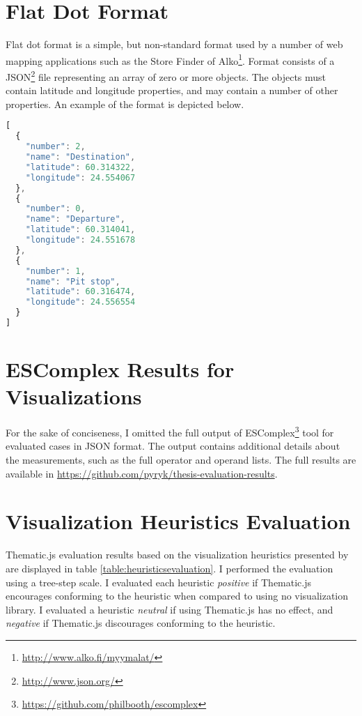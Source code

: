 
\chapter{Flat Dot Format}
\label{appendix:flatdotformat}

Flat dot format is a simple, but non-standard format used by a number of web mapping applications such as the Store Finder of Alko\footnote{\url{http://www.alko.fi/myymalat/}}. Format consists of a JSON\footnote{\url{http://www.json.org/}} file representing an array of zero or more objects. The objects must contain latitude and longitude properties, and may contain a number of other properties. An example of the format is depicted below.

\begin{lstlisting}[language=JavaScript]
[
  {
    "number": 2,
    "name": "Destination",
    "latitude": 60.314322,
    "longitude": 24.554067
  },
  {
    "number": 0,
    "name": "Departure",
    "latitude": 60.314041,
    "longitude": 24.551678
  },
  {
    "number": 1,
    "name": "Pit stop",
    "latitude": 60.316474,
    "longitude": 24.556554
  }
]
\end{lstlisting}

\chapter{ESComplex Results for Visualizations}
\label{appendix:escomplex}

For the sake of conciseness, I omitted the full output of ESComplex\footnote{\url{https://github.com/philbooth/escomplex}} tool for evaluated cases in JSON format. The output contains additional details about the measurements, such as the full operator and operand lists. The full results are available in \url{https://github.com/pyryk/thesis-evaluation-results}.

\chapter{Visualization Heuristics Evaluation}
\label{appendix:heuristicsevaluation}

Thematic.js evaluation results based on the visualization heuristics presented by \citet{zuk_heuristics_2006} are displayed in table \ref{table:heuristicsevaluation}. I performed the evaluation using a tree-step scale. I evaluated each heuristic \emph{positive} if Thematic.js encourages conforming to the heuristic when compared to using no visualization library. I evaluated a heuristic \emph{neutral} if using Thematic.js has no effect, and \emph{negative} if Thematic.js discourages conforming to the heuristic.

